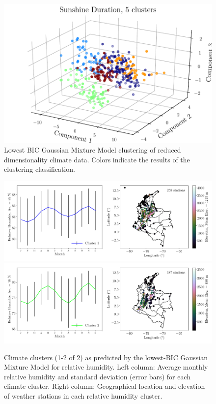 \documentclass[a4paper,fleqn,usenatbib]{mnras}
\begin{document}
\begin{figure}
\begin{center}
\includegraphics[scale=0.5]{ldeb.pdf}
\caption{Lowest BIC Gaussian Mixture Model clustering of reduced dimensionality climate data. Colors indicate the results of the clustering classification.}\label{lde}
\end{center}
\end{figure}

\begin{figure}
\begin{center}
\includegraphics[scale=0.5,trim={0 15 0 18},clip]{gmmh0.pdf}
\includegraphics[scale=0.5,trim={0 15 0 18},clip]{gmmh1.pdf}
\caption{Climate clusters (1-2 of 2) as predicted by the lowest-BIC Gaussian Mixture Model for relative humidity. Left column: Average monthly relative humidity and standard deviation (error bars) for each climate cluster. Right column: Geographical location and elevation of weather stations in each relative humidity cluster.}\label{clusth}
\end{center}
\end{figure}
\end{document}
